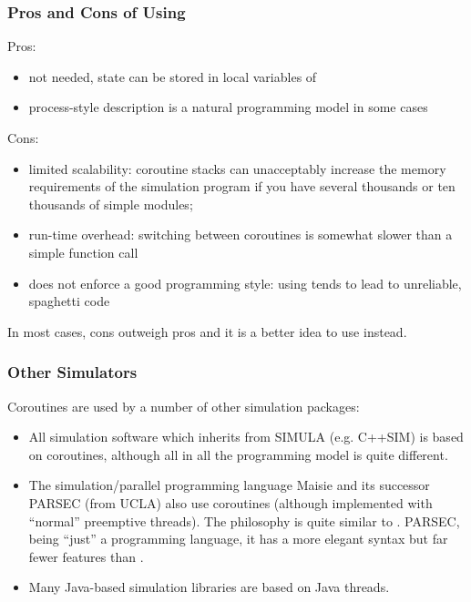 \subsubsection{Pros and Cons of Using }


Pros:
\begin{itemize}
   \item{ not needed, state can be stored in local
       variables of }
   \item{process-style description is a natural programming model in some cases}
\end{itemize}

Cons:
\begin{itemize}
   \item{limited scalability: coroutine stacks can unacceptably increase the
       memory requirements of the simulation program if you have several
       thousands or ten thousands of simple modules;}
   \item{run-time overhead: switching between coroutines is somewhat slower
       than a simple function call}
   \item{does not enforce a good programming style: using 
       tends to lead to unreliable, spaghetti code}
\end{itemize}

In most cases, cons outweigh pros and it is a better idea to use
 instead.


\subsubsection{Other Simulators}


Coroutines are used by a number of other simulation packages:
\begin{itemize}
\item{All simulation software which inherits from SIMULA (e.g. C++SIM)
    is based on coroutines, although all in all the programming
    model is quite different.}
\item{The simulation/parallel programming language Maisie and its successor
    PARSEC (from UCLA) also use coroutines (although implemented
    with ``normal'' preemptive threads). The philosophy
    is quite similar to {\opp}. PARSEC, being ``just''
    a programming language, it has a more elegant syntax but far fewer
    features than {\opp}.}
\item{Many Java-based simulation libraries are based on Java
    threads.}
\end{itemize}




